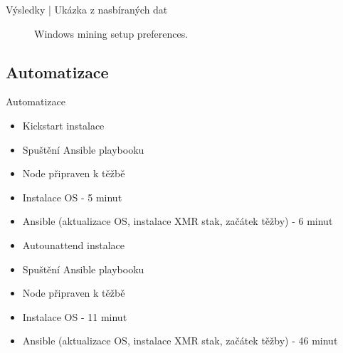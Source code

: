 \documentclass{beamer}
\begin{document}
\begin{darkframes}
\begin{frame}{Výsledky | Ukázka z nasbíraných dat}
\begin{center}
\begin{figure}[H]
\caption{Windows mining setup preferences.}
\label{chart:windowshabits}\end{figure}\end{center}

    \end{frame}
    \subsection{Automatizace}
    \begin{frame}{Automatizace}
    
    \begin{multicols}{2}
\begin{itemize}
\item<1-4> Kickstart instalace
\item<1-4> Spuštění Ansible playbooku
\item<1-4> Node připraven k těžbě
\end{itemize}
\begin{itemize}
\item<3-4>  Instalace OS - 5 minut
\item<3-4>  Ansible (aktualizace OS, instalace XMR stak, začátek těžby) - 6 minut
\end{itemize}

\columnbreak
{}
\begin{itemize}
\item<2-4>  Autounattend instalace
\item<2-4> Spuštění Ansible playbooku
\item<2-4> Node připraven k těžbě
\end{itemize}
\begin{itemize}
\item<4> Instalace OS - 11 minut
\item<4> Ansible (aktualizace OS, instalace XMR stak, začátek těžby) - 46 minut
\end{itemize}
\end{multicols}
 

\end{frame}
\end{darkframes}
\end{document}
